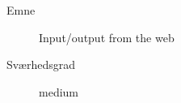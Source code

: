 \begin{description}
\item[Emne] Input/output from the web
\item[Sværhedsgrad] medium
\end{description}
